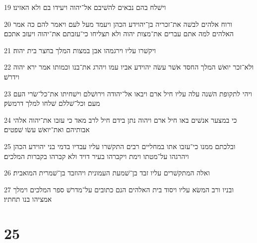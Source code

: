 \par 19 וישׁלח בהם נבאים להשׁיבם אל־יהוה ויעידו בם ולא האזינו׃
\par 20 ורוח אלהים לבשׁה את־זכריה בן־יהוידע הכהן ויעמד מעל לעם ויאמר להם כה אמר האלהים למה אתם עברים את־מצות יהוה ולא תצליחו כי־עזבתם את־יהוה ויעזב אתכם׃
\par 21 ויקשׁרו עליו וירגמהו אבן במצות המלך בחצר בית יהוה׃
\par 22 ולא־זכר יואשׁ המלך החסד אשׁר עשׂה יהוידע אביו עמו ויהרג את־בנו וכמותו אמר ירא יהוה וידרשׁ׃
\par 23 ויהי לתקופת השׁנה עלה עליו חיל ארם ויבאו אל־יהודה וירושׁלם וישׁחיתו את־כל־שׂרי העם מעם וכל־שׁללם שׁלחו למלך דרמשׂק׃
\par 24 כי במצער אנשׁים באו חיל ארם ויהוה נתן בידם חיל לרב מאד כי עזבו את־יהוה אלהי אבותיהם ואת־יואשׁ עשׂו שׁפטים׃
\par 25 ובלכתם ממנו כי־עזבו אתו במחליים רבים התקשׁרו עליו עבדיו בדמי בני יהוידע הכהן ויהרגהו על־מטתו וימת ויקברהו בעיר דויד ולא קברהו בקברות המלכים׃
\par 26 ואלה המתקשׁרים עליו זבד בן־שׁמעת העמונית ויהוזבד בן־שׁמרית המואבית׃
\par 27 ובניו ורב המשׂא עליו ויסוד בית האלהים הנם כתובים על־מדרשׁ ספר המלכים וימלך אמציהו בנו תחתיו׃

\chapter{25}

